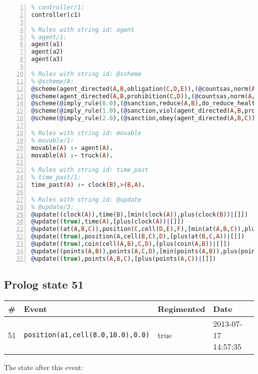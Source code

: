 \documentclass[11pt]{article}\usepackage[utf8]{inputenc}\usepackage{geometry}
\begin{document}
\begin{lstlisting}[language=Prolog, numbers=left]
% Rules with string id: controller
% controller/1:
controller(c1)

% Rules with string id: agent
% agent/1:
agent(a1)
agent(a2)
agent(a3)

% Rules with string id: @scheme
% @scheme/8:
@scheme(agent_directed(A,B,obligation(C,D,E)),(@countsas,norm(A,B,F,obligation(C,D,E)),F),false,(listTrue(C)),(time_past(D)),false,[plus(viol(agent_directed(A,B,obligation(C,D,E))))|[]],[plus(obey(agent_directed(A,B,obligation(C,D,E))))|[]])
@scheme(agent_directed(A,B,prohibition(C,D)),(@countsas,norm(A,B,E,prohibition(C,D)),E),(listTrue(C)),false,(false),false,[plus(viol(agent_directed(A,B,prohibition(C,D))))|[]],[plus(obey(agent_directed(A,B,prohibition(C,D))))|[]])
@scheme(@imply_rule(0.0),(@sanction,reduce(A,B),do_reduce_health(A,B),notifyAgent(A,changed(status))),true,false,false,false,[min(reduce(A,B))|[]],[])
@scheme(@imply_rule(1.0),(@sanction,viol(agent_directed(A,B,prohibition(C,D))),do_sanction(D)),true,false,false,false,[min(viol(agent_directed(A,B,prohibition(C,D))))|[]],[])
@scheme(@imply_rule(2.0),(@sanction,obey(agent_directed(A,B,C))),true,false,false,false,[min(obey(agent_directed(A,B,C)))|[]],[])

% Rules with string id: movable
% movable/1:
movable(A) :- agent(A).
movable(A) :- truck(A).

% Rules with string id: time_past
% time_past/1:
time_past(A) :- clock(B),>(B,A).

% Rules with string id: @update
% @update/3:
@update((clock(A)),time(B),[min(clock(A)),plus(clock(B))|[]])
@update((true),time(A),[plus(clock(A))|[]])
@update((at(A,B,C)),position(C,cell(D,E),F),[min(at(A,B,C)),plus(at(D,E,C))|[]])
@update((true),position(A,cell(B,C),D),[plus(at(B,C,A))|[]])
@update((true),coin(cell(A,B),C,D),[plus(coin(A,B))|[]])
@update((points(A,B)),points(A,C,D),[min(points(A,B)),plus(points(A,D))|[]])
@update((true),points(A,B,C),[plus(points(A,C))|[]])

\end{lstlisting}
\clearpage 
\subsection{Prolog state 51}
\begin{table}[ht]
\centering 
\begin{tabular}{l l l l} 
\textbf{\#} & \textbf{Event} & \textbf{Regimented} & \textbf{Date} \\ [0.5ex] 
\hline
51&\texttt{position(a1,cell(8.0,10.0),0.0)}&true&2013-07-17 14:57:35\\ [1ex] \hline\end{tabular}
\end{table}
The state after this event:
\end{document}
